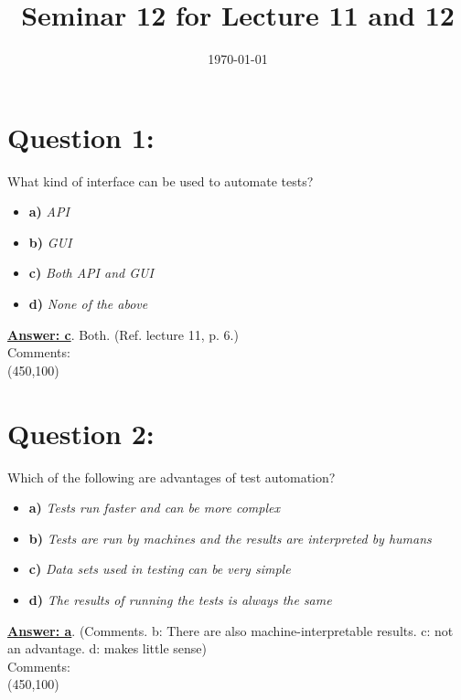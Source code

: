 \documentclass[12pt,a4paper,norsk]{article}
\title{Seminar 12 for Lecture 11 and 12}
\author{ }
\date{\today}
\begin{document}
\maketitle
\section{Question 1:}

What kind of interface can be used to automate tests?

\begin{itemize}
 \item \textbf{a)} \textit{API}
 \item \textbf{b)} \textit{GUI}
 \item \textbf{c)} \textit{Both API and GUI}
 \item \textbf{d)} \textit{None of the above}
\end{itemize}


\underline{\textbf{Answer: c}}. Both. (Ref. lecture 11, p. 6.)\\


\noindent Comments:\\
\framebox(450,100){}\\

\section{Question 2:} Which of the following are advantages of test automation? \\

\begin{itemize}
 \item \textbf{a)} \textit{Tests run faster and can be more complex}
 \item \textbf{b)} \textit{Tests are run by machines and the results are interpreted by humans}
 \item \textbf{c)} \textit{Data sets used in testing can be very simple}
 \item \textbf{d)} \textit{The results of running the tests is always the same}
\end{itemize}

\underline{\textbf{Answer: a}}. (Comments. b: There are also machine-interpretable results. c: not an advantage. d: makes little sense) \\


\noindent Comments:\\
\framebox(450,100){}\\
\end{document}

